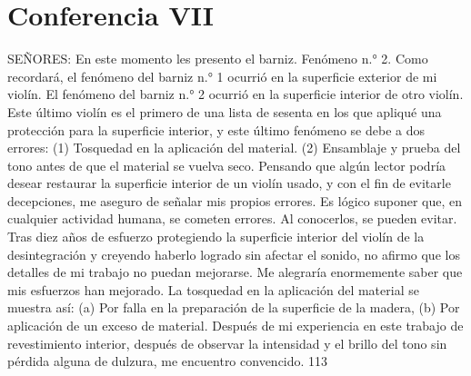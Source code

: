 \chapter*{Conferencia VII}
SEÑORES: En este momento les presento el barniz.
Fenómeno n.° 2. Como recordará, el fenómeno del barniz n.° 1 ocurrió en la superficie exterior de mi violín. El fenómeno del barniz n.° 2 ocurrió en la superficie interior de otro violín. Este último violín es el primero de una lista de sesenta en los que apliqué una protección para la superficie interior, y este último fenómeno se debe a dos errores:
(1) Tosquedad en la aplicación del material. (2) Ensamblaje y prueba del tono antes de que el material se vuelva
seco.
Pensando que algún lector podría desear restaurar la superficie interior de un violín usado, y con el fin de evitarle decepciones, me aseguro de señalar mis propios errores. Es lógico suponer que, en cualquier actividad humana, se cometen errores. Al conocerlos, se pueden evitar. Tras diez años de esfuerzo protegiendo la superficie interior del violín de la desintegración y creyendo haberlo logrado sin afectar el sonido, no afirmo que los detalles de mi trabajo no puedan mejorarse. Me alegraría enormemente saber que mis esfuerzos han mejorado.
La tosquedad en la aplicación del material se muestra así: (a) Por falla en la preparación de la superficie de la madera, (b) Por aplicación de un exceso de material. Después de mi experiencia en este trabajo de revestimiento interior, después de observar la intensidad y el brillo del tono sin pérdida alguna de dulzura, me encuentro convencido.
113

